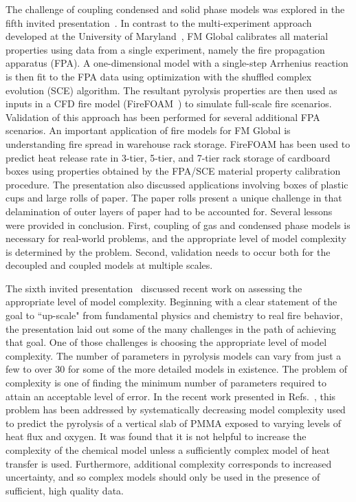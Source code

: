 The challenge of coupling condensed and solid phase models was explored in the fifth invited presentation~\cite{CPS:Wang}.  In contrast to the multi-experiment approach developed at the University of Maryland~\cite{CPS:Leventon}, FM Global calibrates all material properties using data from a single experiment, namely the fire propagation apparatus (FPA).  A one-dimensional model with a single-step Arrhenius reaction is then fit to the FPA data using optimization with the shuffled complex evolution (SCE) algorithm.  The resultant pyrolysis properties are then used as inputs in a CFD fire model (FireFOAM~\cite{FireFOAM}) to simulate full-scale fire scenarios.  Validation of this approach has been performed for several additional FPA scenarios.  An important application of fire models for FM Global is understanding fire spread in warehouse rack storage.  FireFOAM has been used to predict heat release rate in 3-tier, 5-tier, and 7-tier rack storage of cardboard boxes using properties obtained by the FPA/SCE material property calibration procedure.  The presentation also discussed applications involving boxes of plastic cups and large rolls of paper.  The paper rolls present a unique challenge in that delamination of outer layers of paper had to be accounted for.  Several lessons were provided in conclusion.  First, coupling of gas and condensed phase models is necessary for real-world problems, and the appropriate level of model complexity is determined by the problem.  Second, validation needs to occur both for the decoupled and coupled models at multiple scales.

The sixth invited presentation~\cite{CPS:Rein} discussed recent work on assessing the appropriate level of model complexity.  Beginning with a clear statement of the goal to ``up-scale" from fundamental physics and chemistry to real fire behavior, the presentation laid out some of the many challenges in the path of achieving that goal.  One of those challenges is choosing the appropriate level of model complexity.  The number of parameters in pyrolysis models can vary from just a few to over 30 for some of the more detailed models in existence.  The problem of complexity is one of finding the minimum number of parameters required to attain an acceptable level of error.  In the recent work presented in Refs.~\cite{Rein:2013,Rein:2015}, this problem has been addressed by systematically decreasing model complexity used to predict the pyrolysis of a vertical slab of PMMA exposed to varying levels of heat flux and oxygen.  It was found that it is not helpful to increase the complexity of the chemical model unless a sufficiently complex model of heat transfer is used.  Furthermore, additional complexity corresponds to increased uncertainty, and so complex models should only be used in the presence of sufficient, high quality data.


